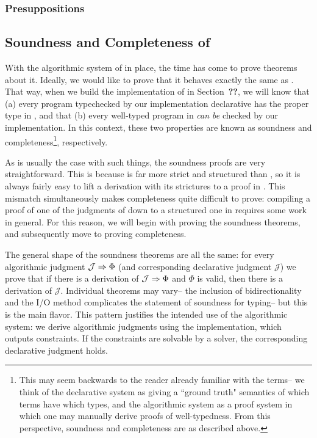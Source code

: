 \subsubsection{Presuppositions}



\subsection{Soundness and Completeness of \bilambdaamor}
With the algorithmic system of \bilambdaamor in place, the time has come to prove theorems about it. Ideally, we would like to prove that it behaves exactly the same as \dlambdaamor. That way, when we build the implementation of \bilambdaamor in Section~\textbf{??}, we will know that (a) every program typechecked by our implementation declarative has the proper type in \dlambdaamor, and that (b) every well-typed program in \dlambdaamor \textit{can be} checked by our implementation. In this context, these two properties are known as soundness and completeness\footnote{
This may seem backwards to the reader already familiar with the terms-- we think of the declarative system as giving a ``ground truth" semantics of which terms have which types, and the algorithmic system as a proof system in which one may manually derive proofs of well-typedness. From this perspective, soundness and completeness are as described above.
}, respectively.

As is usually the case with such things, the soundness proofs are very straightforward. This is because \bilambdaamor is far more strict and structured than \dlambdaamor, so it is always fairly easy to lift a \bilambdaamor derivation with its strictures to a proof in \dlambdaamor. This mismatch simultaneously makes completeness quite difficult to prove: compiling a proof of one of the judgments of \dlambdaamor down to a structured one in \bilambdaamor requires some work in general. For this reason, we will begin with proving the soundness theorems, and subsequently move to proving completeness.

The general shape of the soundness theorems are all the same: for every algorithmic judgment $\mathcal{J} \Rightarrow \Phi$ (and corresponding declarative judgment $\mathcal{J}$) we prove that if there is a derivation of $\mathcal{J} \Rightarrow \Phi$ and $\Phi$ is valid, then there is a derivation of $\mathcal{J}$. Individual theorems may vary-- the inclusion of bidirectionality and the I/O method complicates the statement of soundness for typing-- but this is the main flavor. This pattern justifies the intended use of the algorithmic system: we derive algorithmic judgments using the implementation, which outputs constraints. If the constraints are solvable by a solver, the corresponding declarative judgment holds.

